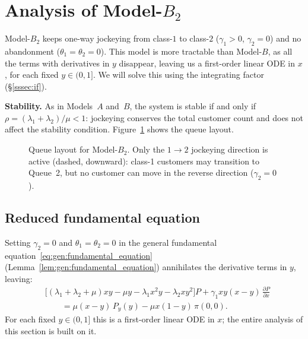 \section{Analysis of Model-\texorpdfstring{$B_2$}{B2}}\label{sec:model_b2}

Model-$B_2$ keeps one-way jockeying from class-$1$ to class-$2$ ($\gamma_1>0$, $\gamma_2=0$) and no abandonment ($\theta_1=\theta_2=0$). This model is more tractable than Model-$B$, as all the terms with derivatives in $y$ disappear, leaving us a first-order linear ODE in $x$, for each fixed $y\in(0,1]$. We will solve this using the integrating factor (\S\ref{sssec:if}). 

\textbf{Stability.} As in Models~$A$ and~$B$, the system is stable if and only if $\rho = (\lambda_1+\lambda_2)/\mu < 1$: jockeying conserves the total customer count and does not affect the stability condition.
Figure~\ref{fig:model-b2-queue} shows the queue layout.
\begin{figure}[H]
    \centering
    \resizebox{0.62\textwidth}{!}{%
    }
    \caption{Queue layout for Model-$B_2$. Only the $1\to2$ jockeying direction
    is active (dashed, downward): class-1 customers may transition to Queue~2,
    but no customer can move in the reverse direction ($\gamma_2=0$).}
    \label{fig:model-b2-queue}
\end{figure}

\subsection{Reduced fundamental equation}\label{ssec:B2:reduction}

Setting $\gamma_2=0$ and $\theta_1=\theta_2=0$ in the general fundamental equation~\eqref{eq:gen:fundamental_equation} (Lemma~\ref{lem:gen:fundamental_equation}) annihilates the derivative terms in $y$, leaving:
\begin{align}
    &\bigl[(\lambda_1+\lambda_2+\mu)xy - \mu y - \lambda_1 x^2 y - \lambda_2 xy^2\bigr]P
    + \gamma_1 xy(x-y)\,\frac{\partial P}{\partial x} \nonumber \\
    &\qquad = \mu(x-y)\,P_y(y) - \mu x(1-y)\,\pi(0,0).
    \label{eq:B2:fundamental}
\end{align}
For each fixed $y\in(0,1]$ this is a first-order linear ODE in $x$; the entire analysis
of this section is built on it.

